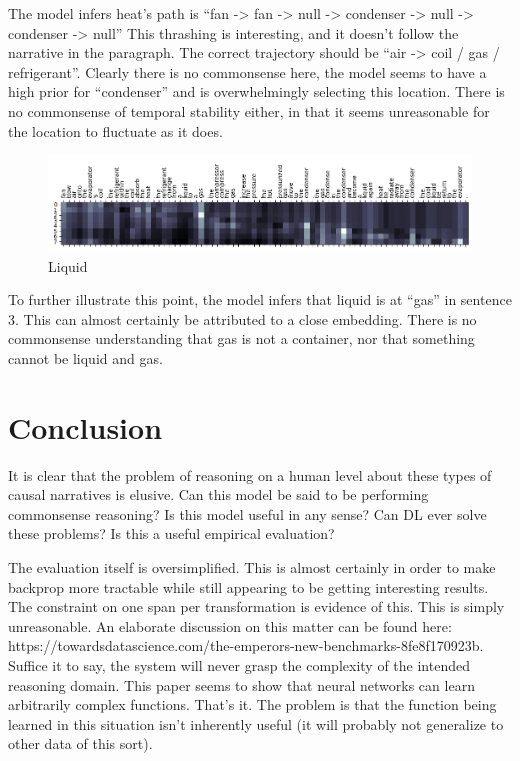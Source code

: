\documentclass[11pt,a4paper]{article}
\begin{document}
The model infers heat’s path is “fan -> fan -> null -> condenser -> null -> condenser -> null”
This thrashing is interesting, and it doesn’t follow the narrative in the paragraph. The correct trajectory should be “air -> coil / gas / refrigerant”. Clearly there is no commonsense here, the model seems to have a high prior for “condenser” and is overwhelmingly selecting this location. There is no commonsense of temporal stability either, in that it seems unreasonable for the location to fluctuate as it does. 


\begin{figure}[h]
  \includegraphics[width=\linewidth]{images/liquid.png}
  \caption{Liquid}
  \label{fig:boat1}
\end{figure}

To further illustrate this point, the model infers that liquid is at “gas” in sentence 3. This can almost certainly be attributed to a close embedding. There is no commonsense understanding that gas is not a container, nor that something cannot be liquid and gas.

\section{Conclusion}

It is clear that the problem of reasoning on a human level about these types of causal narratives is elusive. Can this model be said to be performing commonsense reasoning? Is this model useful in any sense? Can DL ever solve these problems? Is this a useful empirical evaluation?

The evaluation itself is oversimplified. This is almost certainly in order to make backprop more tractable while still appearing to be getting interesting results. The constraint on one span per transformation is evidence of this. This is simply unreasonable. An elaborate discussion on this matter can be found here: https://towardsdatascience.com/the-emperors-new-benchmarks-8fe8f170923b.
Suffice it to say, the system will never grasp the complexity of the intended reasoning domain. This paper seems to show that neural networks can learn arbitrarily complex functions. That’s it. The problem is that the function being learned in this situation isn’t inherently useful (it will probably not generalize to other data of this sort).
\end{document}
